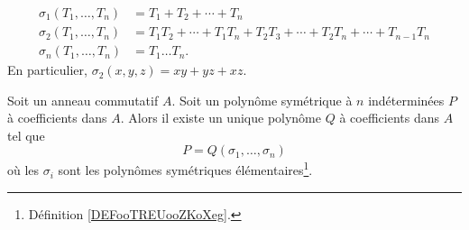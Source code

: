 \begin{subequations}
	\begin{align}
		\sigma_1(T_1,\ldots, T_n) & =T_1+T_2+\cdots +T_n                                            \\
		\sigma_2(T_1,\ldots, T_n) & =T_1T_2+\cdots +T_1T_n+T_2T_3+\cdots +T_2T_n+\cdots +T_{n-1}T_n \\
		\sigma_n(T_1,\ldots, T_n) & =T_1\ldots T_n.
	\end{align}
\end{subequations}
En particulier, \( \sigma_2(x,y,z)=xy+yz+xz\).

\begin{theorem}  \label{TholReBiw}
	Soit un anneau commutatif \( A\). Soit un polynôme symétrique à \( n\) indéterminées \( P\) à coefficients dans \( A\). Alors il existe un unique polynôme \( Q\) à coefficients dans \( A\) tel que
	\begin{equation}
		P=Q(\sigma_1,\ldots,\sigma_n)
	\end{equation}
	où les \( \sigma_i\) sont les polynômes symétriques élémentaires\footnote{Définition \ref{DEFooTREUooZKoXeg}.}.
\end{theorem}

